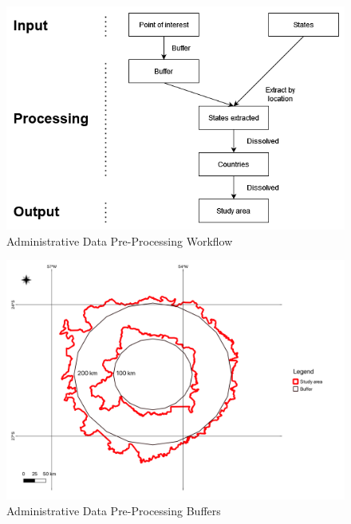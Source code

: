\documentclass[11pt, a4paper]{report}
\begin{document}
\begin{figure}[H]
  \centering
  \includegraphics[width=0.9\linewidth]{figures/studyareaworkflow.png}
  \caption{Administrative Data Pre-Processing Workflow}
  \label{fig:studyareaworkflow}
\end{figure}

\begin{figure}[H]
  \centering
  \includegraphics[width=0.9\linewidth]{figures/Buffer.png}
  \caption{Administrative Data Pre-Processing Buffers}
  \label{fig:buffer}
\end{figure}
\end{document}
